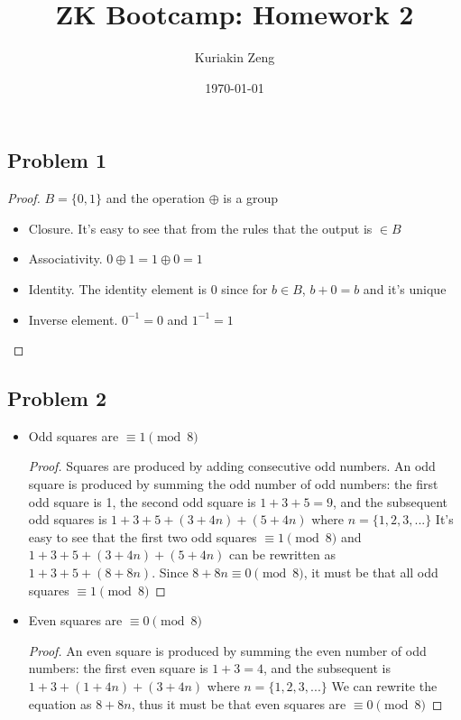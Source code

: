 \documentclass{article}
\title{ZK Bootcamp: Homework 2}
\author{Kuriakin Zeng}
\date\today
\begin{document}
\maketitle %


\subsection*{Problem 1}
\begin{proof}
$B = \{0,1\}$ and the operation $\oplus$ is a group
\begin{itemize}
\item Closure. It's easy to see that from the rules that the output is $\in B$
\item Associativity. $0 \oplus 1 = 1 \oplus 0 = 1$
\item Identity. The identity element is 0 since for $b \in B$, $b + 0 = b$ and it's unique
\item Inverse element. $0^{-1} = 0$ and $1^{-1} = 1$
\end{itemize}
\end{proof}

\subsection*{Problem 2}
\begin{itemize}
\item Odd squares are $\equiv 1 \pmod 8$
\begin{proof}
Squares are produced by adding consecutive odd numbers. An odd square is produced by summing the odd number of odd numbers: the first odd square is 1, the second odd square is $1+3+5 = 9$, and the subsequent odd squares is $1+3+5+(3+4n)+(5+4n)$ where $n = \{1, 2, 3, ...\} $
It's easy to see that the first two odd squares $\equiv 1 \pmod 8$ and $1+3+5+(3+4n)+(5+4n)$ can be rewritten as $1+3+5+(8+8n)$. Since $8+8n \equiv 0 \pmod 8$, it must be that all odd squares $\equiv 1 \pmod 8$
\end{proof}
\item Even squares are $\equiv 0 \pmod 8$
\begin{proof}
An even square is produced by summing the even number of odd numbers: the first even square is $1+3=4$, and the subsequent is $1+3+(1+4n)+(3+4n)$ where $n = \{1,2,3,...\}$
We can rewrite the equation as $8+8n$, thus it must be that even squares are $\equiv 0 \pmod 8$
\end{proof}
\end{itemize}
\end{document}
